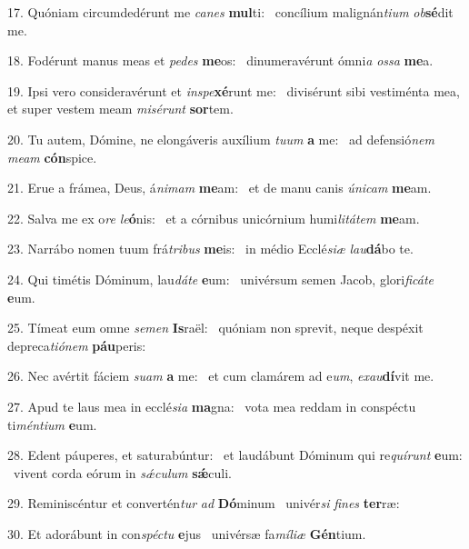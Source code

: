 17. Quóniam circumdedérunt me \textit{ca}\textit{nes} \textbf{mul}ti: \ast\  concílium malignán\textit{ti}\textit{um} \textit{ob}\textbf{sé}dit me.\

18. Fodérunt manus meas et \textit{pe}\textit{des} \textbf{me}os: \ast\  dinumeravérunt ómni\textit{a} \textit{os}\textit{sa} \textbf{me}a.\

19. Ipsi vero consideravérunt et \textit{in}\textit{spe}\textbf{xé}runt me: \ast\  divisérunt sibi vestiménta mea, et super vestem meam \textit{mi}\textit{sé}\textit{runt} \textbf{sor}tem.\

20. Tu autem, Dómine, ne elongáveris auxílium \textit{tu}\textit{um} \textbf{a} me: \ast\  ad defensió\textit{nem} \textit{me}\textit{am} \textbf{cón}spice.\

21. Erue a frámea, Deus, á\textit{ni}\textit{mam} \textbf{me}am: \ast\  et de manu canis \textit{ú}\textit{ni}\textit{cam} \textbf{me}am.\

22. Salva me ex o\textit{re} \textit{le}\textbf{ó}nis: \ast\  et a córnibus unicórnium humi\textit{li}\textit{tá}\textit{tem} \textbf{me}am.\

23. Narrábo nomen tuum frá\textit{tri}\textit{bus} \textbf{me}is: \ast\  in médio Ecclé\textit{si}\textit{æ} \textit{lau}\textbf{dá}bo te.\

24. Qui timétis Dóminum, lau\textit{dá}\textit{te} \textbf{e}um: \ast\  univérsum semen Jacob, glori\textit{fi}\textit{cá}\textit{te} \textbf{e}um.\

25. Tímeat eum omne \textit{se}\textit{men} \textbf{Is}raël: \ast\  quóniam non sprevit, neque despéxit depreca\textit{ti}\textit{ó}\textit{nem} \textbf{páu}peris:\

26. Nec avértit fáciem \textit{su}\textit{am} \textbf{a} me: \ast\  et cum clamárem ad e\textit{um}, \textit{ex}\textit{au}\textbf{dí}vit me.\

27. Apud te laus mea in ecclé\textit{si}\textit{a} \textbf{ma}gna: \ast\  vota mea reddam in conspéctu ti\textit{mén}\textit{ti}\textit{um} \textbf{e}um.\

28. Edent páuperes, et saturabúntur: \dag\  et laudábunt Dóminum qui re\textit{quí}\textit{runt} \textbf{e}um: \ast\  vivent corda eórum in \textit{sǽ}\textit{cu}\textit{lum} \textbf{sǽ}culi.\

29. Reminiscéntur et convertén\textit{tur} \textit{ad} \textbf{Dó}minum \ast\  univér\textit{si} \textit{fi}\textit{nes} \textbf{ter}ræ:\

30. Et adorábunt in con\textit{spéc}\textit{tu} \textbf{e}jus \ast\  univérsæ fa\textit{mí}\textit{li}\textit{æ} \textbf{Gén}tium.\

